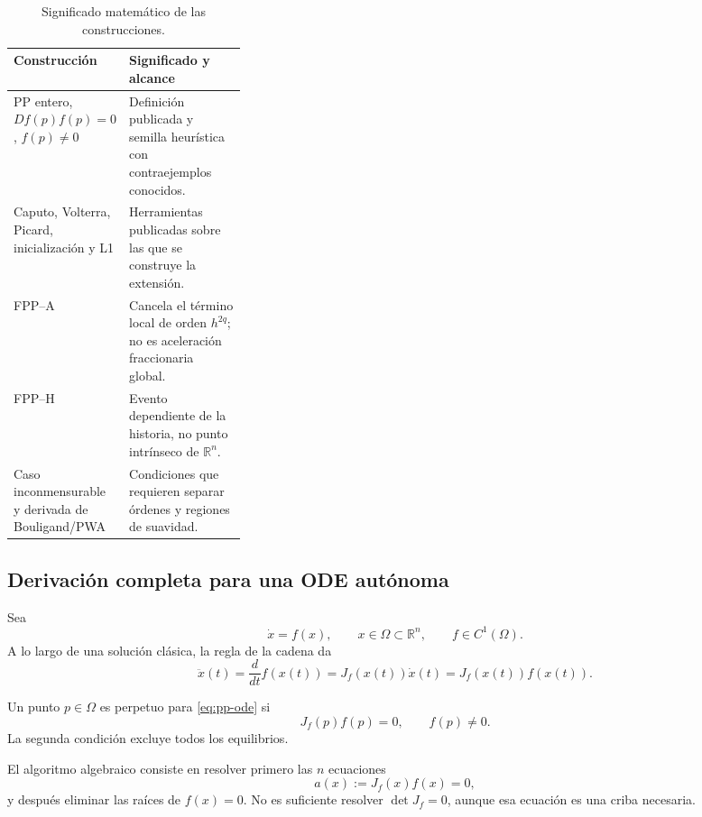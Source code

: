 \begin{table}[H]
\centering
\caption{Significado matemático de las construcciones.}
\label{tab:pp-status-map}
\small
\begin{tabularx}{\linewidth}{@{}L{0.30\linewidth}Y@{}}
\toprule
Construcción & Significado y alcance \\
\midrule
PP entero, \(Df(p)f(p)=0\), \(f(p)\ne0\) & Definición publicada y semilla
heurística con contraejemplos conocidos. \\
Caputo, Volterra, Picard, inicialización y L1 & Herramientas publicadas sobre
las que se construye la extensión. \\
FPP--A & Cancela el término local de orden
\(h^{2q}\); no es aceleración fraccionaria global. \\
FPP--H & Evento dependiente de la historia, no punto
intrínseco de \(\mathbb R^n\). \\
Caso inconmensurable y derivada de Bouligand/PWA & Condiciones que requieren
separar órdenes y regiones de suavidad. \\
\bottomrule
\end{tabularx}
\end{table}

\subsection{Derivación completa para una ODE autónoma}

Sea
\begin{equation}
 \dot x=f(x),\qquad x\in\Omega\subset\mathbb R^n,\qquad f\in C^1(\Omega).
 \label{eq:pp-ode}
\end{equation}
A lo largo de una solución clásica, la regla de la cadena da
\begin{equation}
 \ddot x(t)=\frac{d}{dt}f(x(t))
 =J_f(x(t))\dot x(t)=J_f(x(t))f(x(t)).
 \label{eq:pp-acceleration}
\end{equation}

\begin{definition}
Un punto \(p\in\Omega\) es perpetuo para \cref{eq:pp-ode} si
\begin{equation}
 J_f(p)f(p)=0,
 \qquad f(p)\neq0.
 \label{eq:pp-definition}
\end{equation}
La segunda condición excluye todos los equilibrios.
\end{definition}

El algoritmo algebraico consiste en resolver primero las \(n\) ecuaciones
\begin{equation}
 a(x):=J_f(x)f(x)=0,
 \label{eq:pp-algebraic-system}
\end{equation}
y después eliminar las raíces de \(f(x)=0\). No es suficiente resolver
\(\det J_f=0\), aunque esa ecuación es una criba necesaria.

